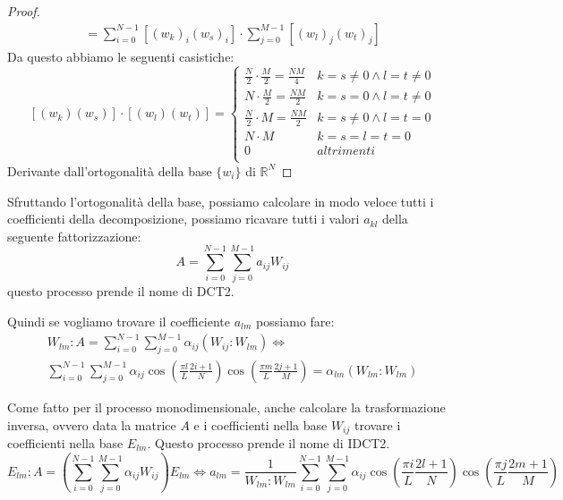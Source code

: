 \begin{proposizione}
\begin{proof}
\begin{equation*}
\begin{array}{l}
                = \sum_{i=0}^{N-1} \left[(w_k)_i(w_s)_i\right] \cdot \sum_{j=0}^{M-1}\left[(w_l)_j(w_t)_j\right]
            \end{array}
        \end{equation*}
        Da questo abbiamo le seguenti casistiche:
        \begin{equation*}
            \left[(w_k)(w_s)\right] \cdot \left[(w_l)(w_t)\right]=\begin{cases}
                \frac{N}{2} \cdot \frac{M}{2} = \frac{NM}{4} & k= s\ne 0 \land  l= t \ne 0 \\
                N \cdot \frac{M}{2} = \frac{NM}{2}           & k= s= 0 \land  l= t \ne 0   \\
                \frac{N}{2} \cdot M = \frac{NM}{2}           & k= s\ne 0 \land  l= t =0    \\
                N\cdot M                                     & k= s=  l= t= 0              \\
                0                                            & altrimenti                  \\
            \end{cases}
        \end{equation*}
        Derivante dall'ortogonalità della base $\{w_i\}$ di $\mathbb{R}^N$
    \end{proof}
\end{proposizione}
Sfruttando l'ortogonalità della base, possiamo calcolare in modo veloce tutti i
coefficienti della decomposizione, possiamo ricavare tutti i valori $a_{kl}$ della
seguente fattorizzazione:
\begin{equation*}
    A = \sum_{i=0}^{N-1}\sum_{j=0}^{M-1} a_{ij}W_{ij}
\end{equation*}
questo processo prende il nome di DCT2.

Quindi se vogliamo trovare il coefficiente $a_{lm}$ possiamo fare:
\begin{equation*}
    \begin{array}{l}
        W_{lm}:A = \sum_{i=0}^{N-1}\sum_{j=0}^{M-1} \alpha_{ij}\left(W_{ij}:W_{lm}\right) \iff \\
        \sum_{i= 0}^{N-1}\sum_{j=0}^{M-1}\alpha_{ij}\cos (\frac{\pi l}{L}\frac{2i+1}{N}) \cos (\frac{\pi m}{L}\frac{2j+1}{M})= \alpha_{lm}\left(W_{lm}:W_{lm}\right)
    \end{array}
\end{equation*}

Come fatto per il processo monodimensionale, anche calcolare la trasformazione
inversa, ovvero data la matrice $A$ e i coefficienti nella base $W_{ij}$ trovare
i coefficienti nella base $E_{lm}$. Questo processo prende il nome di IDCT2.
\begin{equation*}
    E_{lm} : A= \left(\sum_{i=0}^{N-1}\sum_{j=0}^{M-1} \alpha_{ij}W_{ij}\right)E_{lm}
    \iff a_{lm} = \frac{1}{W_{lm}:W_{lm}} \sum_{i=0}^{N-1}\sum_{j=0}^{M-1} \alpha_{ij} \cos \left(\frac{\pi i}{L}\frac{2l+1}{N}\right)\cos \left(\frac{\pi j}{L}\frac{2m+1}{M}\right)
\end{equation*}

